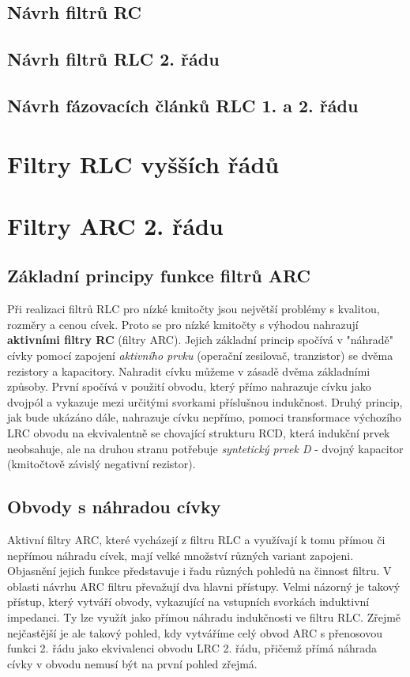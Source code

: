 {    \subsection{Návrh filtrů RC}
    \subsection{Návrh filtrů RLC 2. řádu}
    \subsection{Návrh fázovacích článků RLC 1. a 2. řádu}     
  \section{Filtry RLC vyšších řádů}
    
  \section{Filtry ARC 2. řádu}
    \subsection{Základní principy funkce filtrů ARC}
      Při realizaci filtrů RLC pro nízké kmitočty jsou největší problémy s kvalitou, rozměry a
      cenou cívek. Proto se pro nízké kmitočty s výhodou nahrazují \textbf{aktivními filtry RC}
      (filtry ARC). Jejich základní princip spočívá v "náhradě" cívky pomocí zapojení
      \emph{aktivního prvku} (operační zesilovač, tranzistor) se dvěma rezistory a kapacitory.
      Nahradit cívku můžeme v zásadě dvěma základními způsoby. První spočívá v použití obvodu,
      který přímo nahrazuje cívku jako dvojpól a vykazuje mezi určitými svorkami příslušnou
      indukčnost. Druhý princip, jak bude ukázáno dále, nahrazuje cívku nepřímo, pomoci
      transformace výchozího LRC obvodu na ekvivalentně se chovající strukturu RCD, která indukční
      prvek neobsahuje, ale na druhou stranu potřebuje \emph{syntetický prvek D} - dvojný kapacitor
      (kmitočtově závislý negativní rezistor).

    \subsection{Obvody s náhradou cívky}
      Aktivní filtry ARC, které vycházejí z filtru RLC a využívají k tomu přímou či nepřímou
      náhradu cívek, mají velké množství různých variant zapojeni. Objasnění jejich funkce
      představuje i řadu různých pohledů na činnost filtru. V oblasti návrhu ARC filtru převažují
      dva hlavni přístupy. Velmi názorný je takový přístup, který vytváří obvody, vykazující na
      vstupních svorkách induktivní impedanci. Ty lze využít jako přímou náhradu indukčnosti ve
      filtru RLC. Zřejmě nejčastější je ale takový pohled, kdy vytváříme celý obvod ARC s
      přenosovou funkci 2. řádu jako ekvivalenci obvodu LRC 2. řádu, přičemž přímá náhrada cívky v
      obvodu nemusí být na první pohled zřejmá.

}
